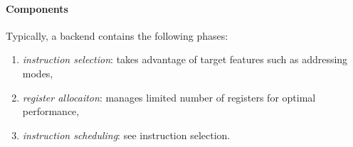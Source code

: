 \documentclass{article}
\begin{document}
\paragraph{Components} Typically, a backend contains the following phases:
\begin{enumerate}
    \item \emph{instruction selection}: takes advantage of target features such as addressing modes,
    \item \emph{register allocaiton}: manages limited number of registers for optimal performance,
    \item \emph{instruction scheduling}: see instruction selection.
\end{enumerate}
\end{document}
